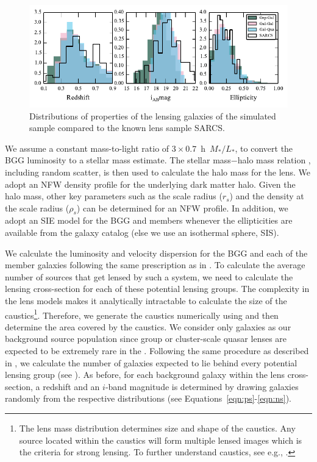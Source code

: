 \documentclass[useAMS,usenatbib,a4paper]{mn2e}
\begin{document}
\begin{figure}
\begin{center}
\includegraphics[scale=1.3]{lensprop.pdf}
\caption{ \label{fig:lensprop}
Distributions of properties of the lensing galaxies of the simulated
sample compared to the known lens sample SARCS.
}
\end{center}
\end{figure}

We assume a constant mass-to-light ratio of $3 \times
0.7$~h~$M_{*}/L_{*}$, to convert the BGG luminosity to a stellar mass
estimate. The stellar mass$-$halo mass relation \citep{Behroozi2013},
including random scatter, is then used to calculate the halo mass for
the lens. We adopt an NFW \citep{Navarro1997} density profile for the
underlying dark matter halo. Given the halo mass, other key parameters
such as the scale radius ($r_s$) and the density at the scale radius
($\rho_s$) can be determined for an NFW profile. In addition, we adopt
an SIE model for the BGG and members whenever the ellipticities are
available from the galaxy catalog (else we use an isothermal sphere,
SIS).

We calculate the luminosity and velocity dispersion for the BGG and each of the
member galaxies following the same prescription as in
. To calculate the average number of sources that get
lensed by such a system, we need to calculate the lensing cross-section for each
of these potential lensing groups. The complexity in the lens models makes it
analytically intractable to calculate the size of the caustics\footnote{The lens
mass distribution determines size and shape of the caustics. Any source
located within the caustics will form multiple lensed images which is the
criteria for strong lensing. To further understand caustics, see e.g., \citet{Schneider1992}.}.
Therefore, we generate the caustics numerically using \gravlens and then
determine the area covered by the caustics. We consider only galaxies as our
background source population since group or cluster-scale quasar lenses are
expected to be extremely rare in the \cfhtls.  Following the same procedure
as described in , we calculate the number of galaxies
expected to lie behind every potential lensing group (see ).
As before, for each background galaxy within the lens cross-section, a redshift
and an $i$-band magnitude is determined by drawing galaxies randomly from the
respective distributions (see Equations~\ref{eqn:ps}-\ref{eqn:ns}).
\end{document}
